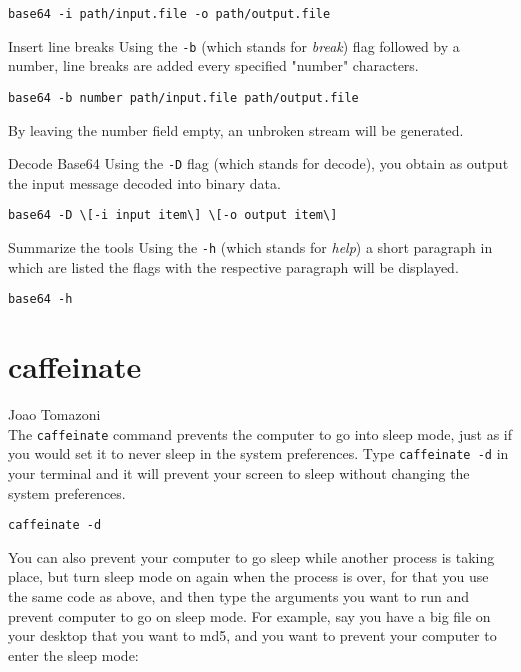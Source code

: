 \documentclass[hidelinks,12pt,a4paper,numbers=enddot]{scrartcl}
\begin{document}
\begin{verbatim}
base64 -i path/input.file -o path/output.file
\end{verbatim}

Insert line breaks
Using the \texttt{-b} (which stands for \emph{break}) flag followed by a
number, line breaks are added every specified "number" characters.

\begin{verbatim}
base64 -b number path/input.file path/output.file
\end{verbatim}

By leaving the number field empty, an unbroken stream will be generated.

Decode Base64
Using the \texttt{-D} flag (which stands for decode), you obtain as
output the input message decoded into binary data.

\begin{verbatim}
base64 -D \[-i input item\] \[-o output item\]
\end{verbatim}

Summarize the tools
Using the \texttt{-h} (which stands for \emph{help}) a short paragraph
in which are listed the flags with the respective paragraph will be displayed.

\begin{verbatim}
base64 -h
\end{verbatim}

\section{caffeinate}


\large Joao Tomazoni \normalsize\\



The \texttt{caffeinate} command prevents the computer to go into sleep mode,
just as if you would set it to never sleep in the system preferences.
Type \texttt{caffeinate -d} in your terminal and it will prevent your screen to sleep
without changing the system preferences.

\begin{verbatim}
caffeinate -d
\end{verbatim}

You can also prevent your computer to go sleep while another process is taking place, but turn sleep
mode on again when the process is over, for that you use the same code as above, and then type the
arguments you want to run and prevent computer to go on sleep mode. For example, say you have a
big file on your desktop that you want to md5, and you want to prevent your computer to enter
the sleep mode:
\end{document}
